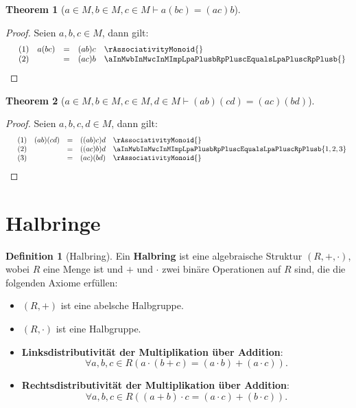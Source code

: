 \documentclass{book}
\theoremstyle{plain}
\newtheorem{theorem}{Theorem}
\theoremstyle{remark}
\theoremstyle{definition}
\newtheorem{definition}{Definition}[section]
\begin{document}
\label{aInMwbInMwcInMImpaPlusLpbPluscRpEqualsLpaPluscRpPlusb}
\begin{theorem}[\(a\in M, b\in M, c\in M \vdash a(bc)=(ac)b\)]
\end{theorem}
\begin{proof}
        Seien \(a,b,c\in M\), dann gilt:
        \[
	\begin{array}{lllcll}
		  &  (1) & a(bc) &=& (ab)c & \rAssociativityMonoid{} \\
            &  (2) &             &=& (ac)b & \aInMwbInMwcInMImpLpaPlusbRpPluscEqualsLpaPluscRpPlusb{} \\
	\end{array}
	\]
\end{proof}

\label{aInMwbInMwcInMwdInMImpLpaPlusbRpPlusLpcPlusdRpEqualsLpaPluscRpPlusLpbPlusdRp}
\begin{theorem}[\(a\in M, b\in M, c\in M, d\in M \vdash (ab)(cd)=(ac)(bd)\)]
\end{theorem}
\begin{proof}
    Seien \(a,b,c,d\in M\), dann gilt:
	\[
	\begin{array}{lllcll}
		  &  (1) & (ab)(cd) &=&((ab)c)d & \rAssociativityMonoid{} \\
            &  (2) &             &=& ((ac)b)d & \aInMwbInMwcInMImpLpaPlusbRpPluscEqualsLpaPluscRpPlusb{1,2,3} \\
    	&  (3) & &=&(ac)(bd) & \rAssociativityMonoid{} \\
	\end{array}
	\]
\end{proof}


\section{Halbringe}

\begin{definition}[Halbring]
    Ein \textbf{Halbring} ist eine algebraische Struktur \((R, +, \cdot)\), wobei \(R\) eine Menge ist und \(+\) und \(\cdot\) zwei binäre Operationen auf \(R\) sind, die die folgenden Axiome erfüllen:
    
    \begin{itemize}
        \item \((R, +)\) ist eine abelsche Halbgruppe.        
        \item \((R, \cdot)\) ist eine Halbgruppe.
        \item \textbf{Linksdistributivität der Multiplikation über Addition}:
        \[
        \forall a, b, c \in R (a \cdot (b + c) = (a \cdot b) + (a \cdot c)).
        \]
        \item \textbf{Rechtsdistributivität der Multiplikation über Addition}:
        \[
        \forall a, b, c \in R ((a + b) \cdot c = (a \cdot c) + (b \cdot c)).
        \]
    \end{itemize}
\end{definition}
\end{document}
